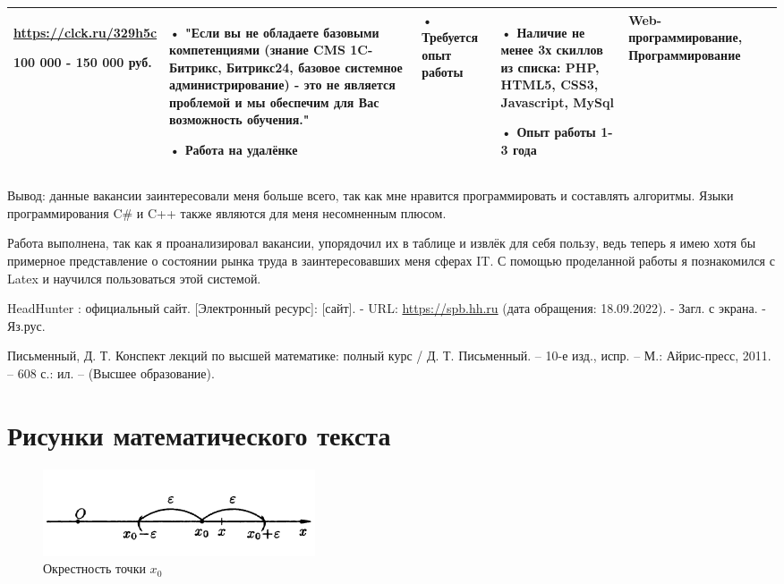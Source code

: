 \documentclass[14pt]{extreport}
\begin{document}
\begin{landscape}
\begin{table}[H]
\begin{center}
\begin{small}
\begin{tabular}{|p{0.1cm}|p{5cm}|p{4.5cm}|p{4.5cm}|p{4cm}|p{3cm}|}
			\url{https://clck.ru/329h5c}
			
			100 000 - 150 000 руб. &
			• "Если вы не обладаете базовыми компетенциями (знание CMS 1C-Битрикс, Битрикс24, базовое системное администрирование) - это не является проблемой и мы обеспечим для Вас возможность обучения."
			
			• Работа на удалёнке
			&
			• Требуется опыт работы
			&
			• Наличие не менее 3х скиллов из списка: PHP, HTML5, CSS3, Javascript, MySql
			
			• Опыт работы 1-3 года
			&
			Web-программирование, Программирование
			\\
			\hline
			\end{tabular}
		\end{small}
	\end{center}
\end{table}			
Вывод: данные вакансии заинтересовали меня больше всего, так как мне нравится программировать и составлять алгоритмы. Языки программирования C\# и C++ также являются для меня несомненным плюсом.
\end{landscape}

\conclusions

Работа выполнена, так как я проанализировал вакансии, упорядочил их в таблице и извлёк для себя пользу, ведь теперь я имею хотя бы примерное представление о состоянии рынка труда в заинтересовавших меня сферах IT. С помощью проделанной работы я познакомился с Latex и научился пользоваться этой системой.

% 
% 

\newpage
\begin{thebibliography}{99}
 HeadHunter : официальный сайт. [Электронный ресурс]: [сайт]. - URL: \url{https://spb.hh.ru} (дата обращения: 18.09.2022). - Загл. с экрана. - Яз.рус.

 Письменный, Д. Т. Конспект лекций по высшей математике: полный курс / Д. Т. Письменный. – 10-е изд., испр. – М.: Айрис-пресс, 2011. – 608 с.: ил. – (Высшее образование).
\end{thebibliography}


\Appendix %

\chapter{Рисунки математического текста}

\begin{figure}[H]
	\centerline{\includegraphics[width=0.5\linewidth]{Окрестность.png}}
	\caption{Окрестность точки $x_0$}
	\label{Окрестность}
\end{figure}
\end{document}
